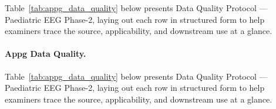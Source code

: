 {\tablestripes\tablefontsize

\noindent Table~\ref{tab:appg_data_quality} below presents Data Quality Protocol --- Paediatric EEG Phase-2, laying out each row in structured form to help examiners trace the source, applicability, and downstream use at a glance. %
\paragraph{Appg Data Quality.} %
\noindent Table~\ref{tab:appg_data_quality} below presents Data Quality Protocol --- Paediatric EEG Phase-2, laying out each row in structured form to help examiners trace the source, applicability, and downstream use at a glance. %



}

